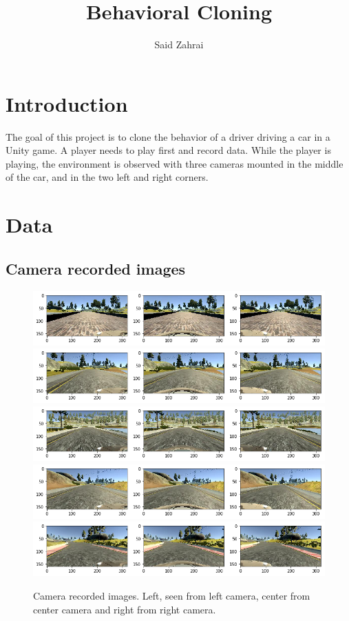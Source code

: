 \documentclass[12pt,a4paper]{article}
\author{Said Zahrai}
\title{Behavioral Cloning}
\begin{document}
	\maketitle
	
	\section{Introduction}
	The goal of this project is to clone the behavior of a driver driving a car in a Unity game. A player needs to play first and record data. While the player is playing, the environment is observed with three cameras mounted in the middle of the car, and in the two left and right corners.
	\section{Data}
	\subsection{Camera recorded images}
	\begin{figure}[h]
		\centering
		\includegraphics[width=0.7\linewidth]{writeup_figures/three_cameras_1}
		\includegraphics[width=0.7\linewidth]{writeup_figures/three_cameras_2}
		\includegraphics[width=0.7\linewidth]{writeup_figures/three_cameras_3}
		\includegraphics[width=0.7\linewidth]{writeup_figures/three_cameras_4}
		\includegraphics[width=0.7\linewidth]{writeup_figures/three_cameras_5}
		\caption{Camera recorded images. Left, seen from left camera, center from center camera and right from right camera.}
		\label{fig:threecameras}
	\end{figure}
\end{document}
